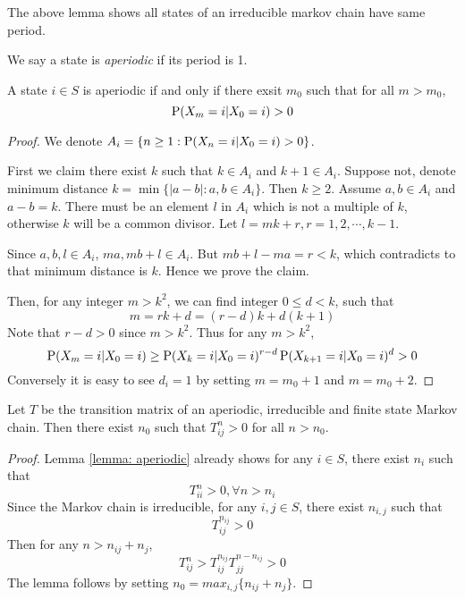 The above lemma shows all states of an irreducible markov chain have same period.

We say a state is \textit{aperiodic} if its period is 1.

\begin{lemma}\label{lemma: aperiodic}
	A state $i\in S$ is aperiodic if and only if there exsit $m_0$ such that for all $m>m_0$,
	$$\P(X_m = i |X_0=i)>0$$
\end{lemma}
\begin{proof}
	We denote $A_i = \{n\geq 1: \P(X_n =i|X_0=i)>0 \}$. 
	
	First we claim there exist $k$ such that $k\in A_i$ and $k+1 \in A_i$. Suppose not, denote minimum distance $k = \min\{|a-b|: a, b \in A_i\}$. Then $k\geq 2$. Assume $a,b\in A_i$ and $a-b =k$. There must be an element $l$ in $A_i$ which is not a multiple of $k$, otherwise $k$ will be a common divisor. Let $l = mk+r, r = 1,2,\cdots, k-1$. 
	
	Since $a,b,l\in A_i$, $ma, mb+l\in A_i$. But $mb+l-ma = r < k$, which contradicts to that minimum distance is $k$. Hence we prove the claim.
	
	Then, for any integer $m> k^2$, we can find integer $0\leq d < k$, such that
	$$m =rk+d = (r-d)k+d(k+1)$$
	Note that $r-d>0$ since $m>k^2$. Thus for any $m>k^2$,
	$$\P(X_m = i |X_0=i)\geq \P(X_k = i |X_0=i)^{r-d}\P(X_{k+1} = i |X_0=i)^d > 0 $$
	Conversely it is easy to see $d_i = 1$ by setting $m=m_0+1$ and $m=m_0+2$.
\end{proof}

\begin{lemma}\label{lemma:semipos}
	Let $T$ be the transition matrix of an aperiodic, irreducible and finite state Markov chain. Then there exist $n_0$ such that
	$T^n_{ij} >0$ for all $n>n_0$.
\end{lemma}
\begin{proof}
	Lemma \ref{lemma: aperiodic} already shows for any $i\in S$, there exist $n_i$ such that
		$$T^n_{ii} >0, \forall n>n_i$$
	Since the Markov chain is irreducible, for any $i,j\in S$, there exist $n_{i,j}$ such that
		$$T^{n_{ij}}_{ij} >0$$
	Then for any $n>n_{ij}+n_j$,
		$$T^{n}_{ij} > T^{n_{ij}}_{ij} T^{n-n_{ij}}_{jj} > 0$$
	The lemma follows by setting $n_0 = max_{i,j} \{n_{ij}+n_j\}$.
\end{proof}

